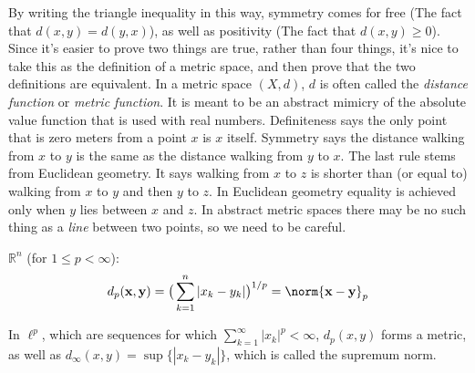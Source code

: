 \documentclass[crop=false,class=book,oneside]{standalone}
\begin{document}
            By writing the triangle inequality in this
            way, symmetry comes for free
            (The fact that $d(x,y)=d(y,x)$), as well
            as positivity (The fact that $d(x,y)\geq{0}$).
            Since it's easier to prove two things are
            true, rather than four things, it's nice to
            take this as the definition of a metric space,
            and then prove that the two definitions are
            equivalent.
            In a metric space $(X,d)$, $d$ is often called the
            \textit{distance function} or
            \textit{metric function}. It is meant to be an
            abstract mimicry of the absolute value function
            that is used with real numbers. Definiteness
            says the only point that is zero meters from a
            point $x$ is $x$ itself. Symmetry says the distance
            walking from $x$ to $y$ is the same as the distance
            walking from $y$ to $x$. The last rule stems from
            Euclidean geometry. It says walking from $x$ to $z$
            is shorter than (or equal to) walking from
            $x$ to $y$ and then $y$ to $z$. In Euclidean
            geometry equality is achieved only when
            $y$ lies between $x$ and $z$. In
            abstract metric spaces there may be no such
            thing as a \textit{line} between two points,
            so we need to be careful.
            \begin{example}
                $\mathbb{R}^{n}$ (for $1\leq{p}<\infty$):
                \begin{equation*}
                    d_{p}(\mathbf{x},\mathbf{y})=
                    \big(
                        \sum_{k=1}^{n}|x_{k}-y_{k}|
                    \big)^{1/p}
                    =\norm{\mathbf{x}-\mathbf{y}}_{p}
                \end{equation*}
            \end{example}
            \begin{example}
                In $\ell^{p}$, which are sequences for
                which
                $\sum_{k=1}^{\infty}|x_{k}|^{p}<\infty$,
                $d_{p}(x,y)$ forms a metric, as well
                as
                $d_{\infty}(x,y)=\sup\{|x_{k}-y_{k}|\}$,
                which is called the supremum norm.
            \end{example}
\end{document}
